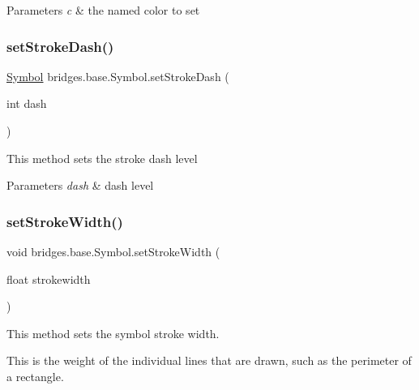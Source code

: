 \begin{DoxyParams}{Parameters}
{\em c} & the named color to set \\
\hline
\end{DoxyParams}
\mbox{\label{classbridges_1_1base_1_1_symbol_ad36224ec7cb588dbbaa8040ef59ffbfc}} 
\subsubsection{\texorpdfstring{set\+Stroke\+Dash()}{setStrokeDash()}}
{\footnotesize\ttfamily \mbox{\hyperlink{classbridges_1_1base_1_1_symbol}{Symbol}} bridges.\+base.\+Symbol.\+set\+Stroke\+Dash (\begin{DoxyParamCaption}\item[{int}]{dash }\end{DoxyParamCaption})}

This method sets the stroke dash level


\begin{DoxyParams}{Parameters}
{\em dash} & dash level \\
\hline
\end{DoxyParams}
\mbox{\label{classbridges_1_1base_1_1_symbol_a68f46f0e555e916c59a69d2b3e9e495d}} 
\subsubsection{\texorpdfstring{set\+Stroke\+Width()}{setStrokeWidth()}}
{\footnotesize\ttfamily void bridges.\+base.\+Symbol.\+set\+Stroke\+Width (\begin{DoxyParamCaption}\item[{float}]{strokewidth }\end{DoxyParamCaption})}



This method sets the symbol stroke width. 

This is the weight of the individual lines that are drawn, such as the perimeter of a rectangle.



